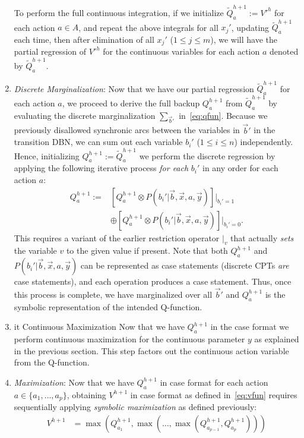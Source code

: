 \documentclass[letterpaper]{article}
\begin{document}
\begin{enumerate}
To perform the full continuous integration, 
if we initialize 
$\tilde{Q}_a^{h+1} := V'^{h}$ for each action $a \in A$, and repeat
the above integrals for all $x_j'$, updating $\tilde{Q}_a^{h+1}$ each time,
then after elimination of all $x_j'$ ($1 \leq j \leq m$), we will have 
the partial regression of $V'^{h}$ for the continuous variables for
each action $a$ denoted by $\tilde{Q}_a^{h+1}$.
\item {\it Discrete Marginalization}: Now that we have our partial
regression $\tilde{Q}_a^{h+1}$ for each action $a$, we proceed
to derive the full backup $Q_a^{h+1}$ from $\tilde{Q}_a^{h+1}$
by evaluating the discrete 
marginalization $\sum_{\vec{b}'}$ in~\eqref{eq:qfun}.
Because we previously disallowed synchronic arcs
between the variables in $\vec{b}'$ 
in the transition DBN, we can sum out each variable $b_i'$ ($1 \leq i \leq n$) 
independently.  Hence, initializing
$Q_a^{h+1} := \tilde{Q}_a^{h+1}$
we perform the discrete regression by applying the following iterative
process \emph{for each} $b_i'$ in any order
for each action $a$:
\begin{align}
Q_a^{h+1} := & \left[ Q_a^{h+1} \otimes P(b_i'|\vec{b},\vec{x},a,\vec{y}) \right]|_{b_i' = 1} \nonumber \\
 & \oplus \left[ Q_a^{h+1} \otimes P(b_i'|\vec{b},\vec{x},a,\vec{y}) \right]|_{b_i' = 0}.
\end{align}
This requires a variant of the earlier restriction operator $|_v$ that
actually \emph{sets} the variable $v$ to the given value if present.
Note that both $Q_a^{h+1}$ and $P(b_i'|\vec{b},\vec{x},a,\vec{y})$ can be represented
as case statements (discrete CPTs \emph{are} case statements), 
and each operation produces a case statement.
Thus, once this process is complete, we have marginalized over
all $\vec{b}'$ and $Q_a^{h+1}$ is the symbolic representation
of the intended Q-function.
\item {it Continuous Maximization} Now that we have $Q_a^{h+1}$ in
the case format we perform continuous maximization for the continuous parameter $y$ as explained in the previous section. This step factors out the continuous action variable from the Q-function. 
\item {\it Maximization}: Now that we have $Q_a^{h+1}$ in
case format for each action $a \in \{a_1,\ldots,a_p\}$, obtaining
$V^{h+1}$ in case format as defined in~\eqref{eq:vfun} requires
sequentially applying
\emph{symbolic maximization} as defined previously:
\begin{align*}
V^{h+1} & = 
\max(Q_{a_1}^{h+1},\max(\ldots,\max(Q_{a_{p-1}}^{h+1},Q_{a_p}^{h+1})))
\end{align*}
\end{enumerate}
\end{document}
